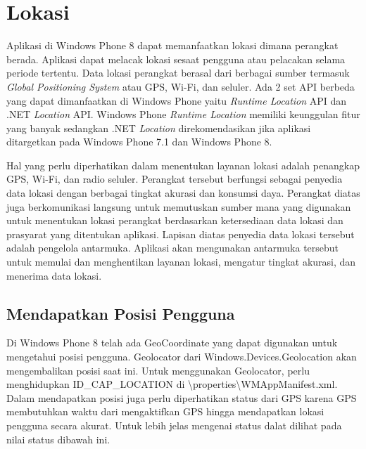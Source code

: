 \section{Lokasi}
\label{sec:Lokasi}
\hspace{0.5cm} Aplikasi di Windows Phone 8 dapat memanfaatkan lokasi dimana perangkat berada. Aplikasi dapat melacak lokasi sesaat  pengguna atau pelacakan selama periode tertentu. Data lokasi perangkat berasal dari berbagai sumber termasuk \textit{Global Positioning System} atau GPS, Wi-Fi, dan seluler. Ada 2 set API berbeda yang dapat dimanfaatkan di Windows Phone yaitu \textit{Runtime Location} API dan .NET \textit{Location} API. Windows Phone \textit{Runtime Location} memiliki keunggulan fitur yang banyak sedangkan .NET \textit{Location} direkomendasikan jika aplikasi ditargetkan pada Windows Phone 7.1 dan Windows Phone 8.

\hspace{0.5cm} Hal yang perlu diperhatikan dalam menentukan layanan lokasi adalah penangkap GPS, Wi-Fi, dan radio seluler. Perangkat tersebut berfungsi sebagai penyedia data lokasi dengan berbagai tingkat akurasi dan konsumsi daya. Perangkat diatas juga berkomunikasi langsung untuk memutuskan sumber mana yang digunakan untuk menentukan lokasi perangkat berdasarkan ketersediaan data lokasi dan prasyarat yang ditentukan aplikasi. Lapisan diatas penyedia data lokasi tersebut adalah pengelola antarmuka. Aplikasi akan mengunakan antarmuka tersebut untuk memulai dan menghentikan layanan lokasi, mengatur tingkat akurasi, dan menerima data lokasi.

\subsection{Mendapatkan Posisi Pengguna}
\label{subsec:Mendapatkan Posisi Pengguna}
\hspace{0.5cm} Di Windows Phone 8 telah ada GeoCoordinate yang dapat digunakan untuk mengetahui posisi pengguna. Geolocator dari Windows.Devices.Geolocation akan mengembalikan posisi saat ini. Untuk menggunakan Geolocator, perlu menghidupkan ID\_CAP\_LOCATION di \textbackslash properties\textbackslash WMAppManifest.xml. Dalam mendapatkan posisi juga perlu diperhatikan status dari GPS karena GPS membutuhkan waktu dari mengaktifkan GPS hingga mendapatkan lokasi pengguna secara akurat. Untuk lebih jelas mengenai status dalat dilihat pada nilai status dibawah ini.

